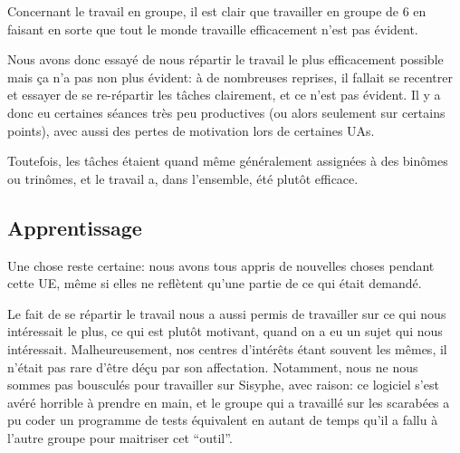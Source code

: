 Concernant le travail en groupe, il est clair que travailler en groupe
de 6 en faisant en sorte que tout le monde travaille efficacement
n'est pas évident.

Nous avons donc essayé de nous répartir le travail le plus
efficacement possible mais ça n'a pas non plus évident: à de
nombreuses reprises, il fallait se recentrer et essayer de se
re-répartir les tâches clairement, et ce n'est pas évident.  Il y a
donc eu certaines séances très peu productives (ou alors seulement sur
certains points), avec aussi des pertes de motivation lors de certaines
UAs.

Toutefois, les tâches étaient quand même généralement assignées à des
binômes ou trinômes, et le travail a, dans l'ensemble, été plutôt
efficace.

\subsection{Apprentissage}
  Une chose reste certaine: nous avons tous appris de nouvelles choses pendant
  cette UE, même si elles ne reflètent qu'une partie de ce qui était demandé.

  Le fait de se répartir le travail nous a aussi permis de travailler sur ce
  qui nous intéressait le plus, ce qui est plutôt motivant, quand on a
  eu un sujet qui nous intéressait. Malheureusement, nos centres
  d'intérêts étant souvent les mêmes, il n'était pas rare d'être déçu
  par son affectation. Notamment, nous ne nous sommes pas bousculés
  pour travailler sur Sisyphe, avec raison: ce logiciel s'est avéré
  horrible à prendre en main, et le groupe qui a travaillé sur les
  scarabées a pu coder un programme de tests équivalent en autant de
  temps qu'il a fallu à l'autre groupe pour maitriser cet ``outil''.
